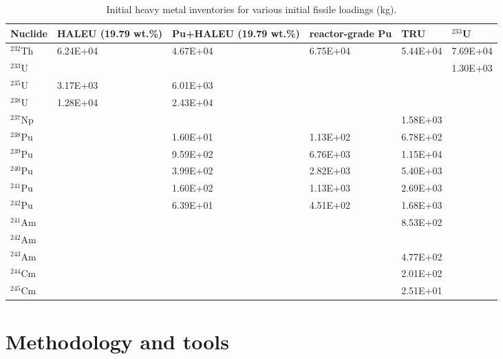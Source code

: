 \begin{table}  %
	\caption{Initial heavy metal inventories for 
	various initial fissile loadings (kg).}
	\vspace{0.1in}
	\begin{tabularx}{\textwidth}{X X p{} 
	p{} X X}
		\hline
		Nuclide & \gls{HALEU} (19.79 wt.\%) & Pu+\gls{HALEU} (19.79 wt.\%) &  
		reactor-grade Pu & \gls{TRU}& $^{233}$U \\	\hline
		$^{232}$Th       &6.24E+04 & 4.67E+04 &   6.75E+04			& 5.44E+04	& 7.69E+04    \\ 
		$^{233}$U        &         & &        &       &  1.30E+03 \\
		$^{235}$U        & 3.17E+03 &6.01E+03	&            &   & \\
		$^{238}$U      	 &1.28E+04  &2.43E+04 &	&  &\\
		$^{237}$Np	  	 &         && &1.58E+03	&    \\
		$^{238}$Pu	  	 &         &1.60E+01	& 1.13E+02 & 6.78E+02	&   \\
		$^{239}$Pu       &         &9.59E+02&6.76E+03& 1.15E+04&    \\
		$^{240}$Pu       &         &3.99E+02& 2.82E+03&5.40E+03&  	\\  
		$^{241}$Pu		 &         &1.60E+02&1.13E+03&2.69E+03&   \\
		$^{242}$Pu		 &         &6.39E+01	&4.51E+02	& 1.68E+03& \\
		$^{241}$Am		 &         &&& 8.53E+02 & \\
		$^{242}$Am		 &         &&&  &\\
		$^{243}$Am       &        & &&4.77E+02&\\
		$^{244}$Cm		 &        & &&2.01E+02&  \\
		$^{245}$Cm		 &        & &&			2.51E+01	&   \\ 
		\hline
	\end{tabularx}
\label{tab:table5}
\end{table}


\section{Methodology and tools} \label{Methodology-and-tools}

